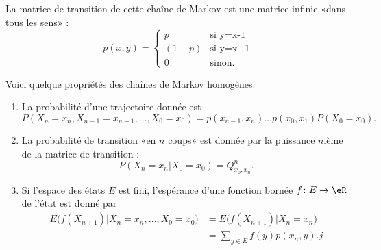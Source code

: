 La matrice de transition de cette chaîne de Markov est une matrice infinie «dans tous les sens» :
\begin{equation}
    p(x,y)=\begin{cases}
        p    &   \text{si y=x-1}\\
        (1-p)    &    \text{si y=x+1}\\
        0    &   \text{sinon}.
    \end{cases}
\end{equation}

\begin{proposition}
    Voici quelque propriétés des chaînes de Markov homogènes.
    \begin{enumerate}
        \item
            La probabilité d'une trajectoire donnée est
            \begin{equation}
                P(X_n=x_n,X_{n-1}=x_{n-1},\ldots,X_0=x_0)=p(x_{n-1},x_n)\dots p(x_0,x_1)P(X_0=x_0).
            \end{equation}
        \item
            La probabilité de transition «en \( n\) coups» est donnée par la puissance \( n\)ième de la matrice de transition :
            \begin{equation}
                P(X_n=x_n|X_0=x_0)=Q^n_{x_0,x_n}.
            \end{equation}
        \item
            Si l'espace des états \( E\) est fini, l'espérance d'une fonction bornée \( f\colon E\to \eR\) de l'état est donné par
            \begin{subequations}
                \begin{align}
                    E\big( f(X_{n+1})|X_n=x_n,\ldots,X_0=x_0 \big)&=E\big( f(X_{n+1})|X_n=x_n \big)\\
                    &=\sum_{y\in E}f(y)p(x_n,y).j
                \end{align}
            \end{subequations}
    \end{enumerate}
\end{proposition}

